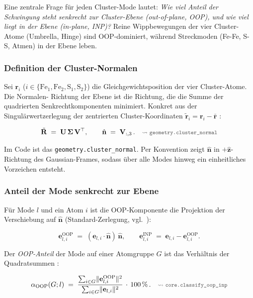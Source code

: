 \documentclass[11pt,a4paper,twoside]{article}
\newcommand{\evec}{\mathbf{e}}
\newcommand{\rvec}{\mathbf{r}}
\newcommand{\nhat}{\hat{\mathbf{n}}}
\newcommand{\zhat}{\hat{\mathbf{z}}}
\newcommand{\Fei}{\mathrm{Fe}}
\newcommand{\OOP}{\mathrm{OOP}}
\newcommand{\INP}{\mathrm{INP}}
\newcommand{\codref}[1]{%
  \quad\text{\textcolor{gray!70!black}{\footnotesize $\rightsquigarrow$~\texttt{#1}}}}
\theoremstyle{remark}
\begin{document}
Eine zentrale Frage f\"ur jeden Cluster-Mode lautet: \emph{Wie viel
Anteil der Schwingung steht senkrecht zur Cluster-Ebene
(out-of-plane, OOP), und wie viel liegt in der Ebene (in-plane, INP)?}
Reine Wippbewegungen der vier Cluster-Atome (Umbrella, Hinge) sind
$\OOP$-dominiert, w\"ahrend Streckmoden (Fe-Fe, S-S, Atmen) in der
Ebene leben.

\subsubsection*{Definition der Cluster-Normalen}

Sei $\rvec_i$ ($i \in \{\Fei_1, \Fei_2, \mathrm{S}_1, \mathrm{S}_2\}$)
die Gleichgewichtsposition der vier Cluster-Atome. Die Normalen-
Richtung der Ebene ist die Richtung, die die Summe der quadrierten
Senkrechtkomponenten minimiert. Konkret aus der Singul\"arwertzerlegung
der zentrierten Cluster-Koordinaten
$\tilde{\rvec}_i = \rvec_i - \bar{\rvec}$ \cite{Kabsch1976}:

\begin{equation}
  \tilde{\mathbf{R}} \;=\; \mathbf{U}\,\boldsymbol{\Sigma}\,\mathbf{V}^\top ,
  \qquad
  \nhat \;=\; \mathbf{V}_{:,3}\,.
  \codref{geometry.cluster\_normal}
  \label{eq:cluster-normal-svd}
\end{equation}

Im Code ist das \texttt{geometry.cluster\_normal}.
Per Konvention zeigt $\nhat$ in $+\zhat$-Richtung des Gaussian-Frames,
sodass \"uber alle Modes hinweg ein einheitliches Vorzeichen entsteht.

\subsubsection*{Anteil der Mode senkrecht zur Ebene}

F\"ur Mode $l$ und ein Atom $i$ ist die OOP-Komponente die Projektion
der Verschiebung auf $\nhat$ (Standard-Zerlegung, vgl.\
\cite{Gee2021}):

\begin{equation}
  \evec_{l,i}^{\OOP} \;=\; (\evec_{l,i} \cdot \nhat)\, \nhat ,
  \qquad
  \evec_{l,i}^{\INP} \;=\; \evec_{l,i} - \evec_{l,i}^{\OOP} .
  \label{eq:oop-projektion}
\end{equation}

Der \emph{OOP-Anteil} der Mode auf einer Atomgruppe $G$ ist das
Verh\"altnis der Quadratsummen \cite{Gee2021}:

\begin{equation}
  \alpha_{\OOP}(G; l) \;=\;
  \frac{\sum_{i \in G} \lVert\evec_{l,i}^{\OOP}\rVert^2}
       {\sum_{i \in G} \lVert\evec_{l,i}\rVert^2} \,\cdot\, 100\,\%
  \,.
  \codref{core.classify\_oop\_inp}
  \label{eq:oop-anteil}
\end{equation}
\end{document}
